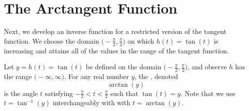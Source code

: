 \documentclass{ximera}
\begin{document}
\section{The Arctangent Function}
Next, we develop an inverse function for a restricted version of the tangent function.  We choose the domain $\Big(\!-\frac{\pi}{2}, \frac{\pi}{2}\Big)$ on which $h(t) = \tan(t)$ is increasing and attains all of the values in the range of the tangent function.%
\begin{definition}
Let $y = h(t) = \tan(t)$ be defined on the domain $\Big(\!-\frac{\pi}{2}, \frac{\pi}{2}\Big)$, and observe $h$ has the range $\big(-\infty,\infty\big)$.  For any real number $y$, the , denoted%
\begin{equation*}
\arctan(y)
\end{equation*}
is the angle $t$ satisfying $-\frac{\pi}{2} < t <  \frac{\pi}{2}$ such that $\tan(t) = y$.
%
Note that we use $t=\tan^{-1}(y)$ interchangeably with with $t = \arctan(y)$. 
\end{definition}
\end{document}
